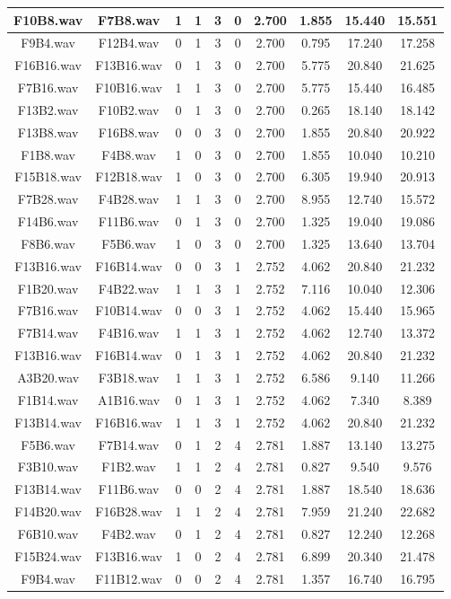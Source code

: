 \documentclass[11pt,a4paper,twoside]{book}
\begin{document}
\begin{longtable}[c]{|c|c|c|c|c|c|c|c|c|c|}
F10B8.wav&F7B8.wav&1&1&3&0&2.700&1.855&15.440&15.551\\ \hline
F9B4.wav&F12B4.wav&0&1&3&0&2.700&0.795&17.240&17.258\\ \hline
F16B16.wav&F13B16.wav&0&1&3&0&2.700&5.775&20.840&21.625\\ \hline
F7B16.wav&F10B16.wav&1&1&3&0&2.700&5.775&15.440&16.485\\ \hline
F13B2.wav&F10B2.wav&0&1&3&0&2.700&0.265&18.140&18.142\\ \hline
F13B8.wav&F16B8.wav&0&0&3&0&2.700&1.855&20.840&20.922\\ \hline
F1B8.wav&F4B8.wav&1&0&3&0&2.700&1.855&10.040&10.210\\ \hline
F15B18.wav&F12B18.wav&1&0&3&0&2.700&6.305&19.940&20.913\\ \hline
F7B28.wav&F4B28.wav&1&1&3&0&2.700&8.955&12.740&15.572\\ \hline
F14B6.wav&F11B6.wav&0&1&3&0&2.700&1.325&19.040&19.086\\ \hline
F8B6.wav&F5B6.wav&1&0&3&0&2.700&1.325&13.640&13.704\\ \hline
F13B16.wav&F16B14.wav&0&0&3&1&2.752&4.062&20.840&21.232\\ \hline
F1B20.wav&F4B22.wav&1&1&3&1&2.752&7.116&10.040&12.306\\ \hline
F7B16.wav&F10B14.wav&0&0&3&1&2.752&4.062&15.440&15.965\\ \hline
F7B14.wav&F4B16.wav&1&1&3&1&2.752&4.062&12.740&13.372\\ \hline
F13B16.wav&F16B14.wav&0&1&3&1&2.752&4.062&20.840&21.232\\ \hline
A3B20.wav&F3B18.wav&1&1&3&1&2.752&6.586&9.140&11.266\\ \hline
F1B14.wav&A1B16.wav&0&1&3&1&2.752&4.062&7.340&8.389\\ \hline
F13B14.wav&F16B16.wav&1&1&3&1&2.752&4.062&20.840&21.232\\ \hline
F5B6.wav&F7B14.wav&0&1&2&4&2.781&1.887&13.140&13.275\\ \hline
F3B10.wav&F1B2.wav&1&1&2&4&2.781&0.827&9.540&9.576\\ \hline
F13B14.wav&F11B6.wav&0&0&2&4&2.781&1.887&18.540&18.636\\ \hline
F14B20.wav&F16B28.wav&1&1&2&4&2.781&7.959&21.240&22.682\\ \hline
F6B10.wav&F4B2.wav&0&1&2&4&2.781&0.827&12.240&12.268\\ \hline
F15B24.wav&F13B16.wav&1&0&2&4&2.781&6.899&20.340&21.478\\ \hline
F9B4.wav&F11B12.wav&0&0&2&4&2.781&1.357&16.740&16.795\\ \hline

\end{longtable}
\end{document}
